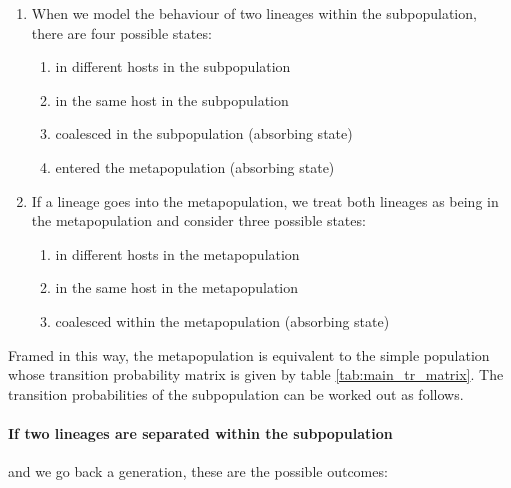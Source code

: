 \documentclass[_main.tex]{subfiles}
\begin{document}
\begin{enumerate}

\item When we model the behaviour of two lineages within the subpopulation, there are four possible states:

\begin{enumerate}

\item in different hosts in the subpopulation

\item in the same host in the subpopulation

\item coalesced in the subpopulation (absorbing state)

\item entered the metapopulation (absorbing state)

\end{enumerate}

\item If a lineage goes into the metapopulation, we treat both lineages as being in the metapopulation and consider three possible states:

\begin{enumerate}

\item in different hosts in the metapopulation

\item in the same host in the metapopulation

\item coalesced within the metapopulation (absorbing state)

\end{enumerate}

\end{enumerate}

Framed in this way, the metapopulation is equivalent to the simple population whose transition probability matrix is given by table \ref{tab:main_tr_matrix}.   The transition probabilities of the subpopulation can be worked out as follows.  


\paragraph{If two lineages are separated within the subpopulation} and we go back a generation, these are the possible outcomes:

\label{supp_trans_matrix_2}
\end{document}
